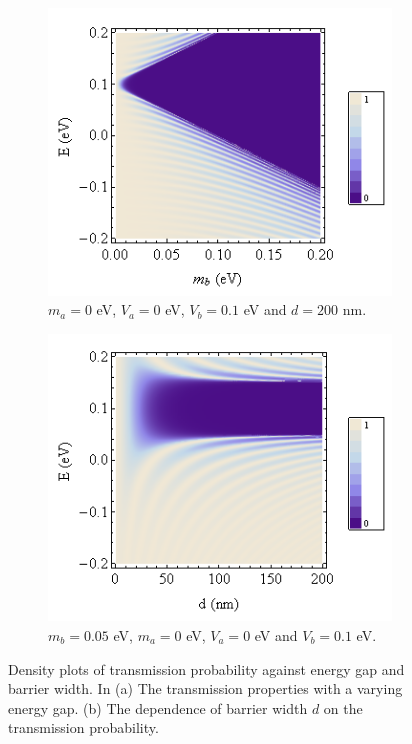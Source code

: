 \begin{figure}
	\begin{subfigure}{0.45\textwidth}
		\centerline{\includegraphics[scale=0.5]{images/contour-t-m}}
		\caption{$m_{a}=0$ eV, $V_{a}=0$ eV, $V_{b}=0.1$ eV and $d=200$ nm.}
	\end{subfigure}
	\hspace{1.2cm}
	\begin{subfigure}{0.45\textwidth}
		\centerline{\includegraphics[scale=0.5]{images/mass-potential-e-d}}
		\caption{$m_{b}=0.05$ eV, $m_{a}=0$ eV, $V_{a}=0$ eV and $V_{b}=0.1$ eV.}
	\end{subfigure}
	\caption{Density plots of transmission probability against energy gap and barrier width. In (a) The transmission properties with a varying energy gap. (b) The dependence of barrier width $d$ on the transmission probability.}
	\label{thinbarrier}
\end{figure}
